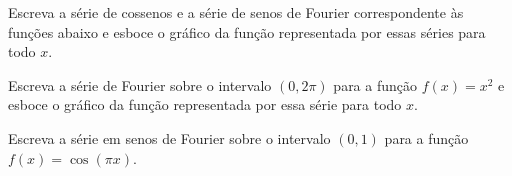 \documentclass[a4paper,12pt, leqno, answers]{exam}
\begin{document}
\begin{questions}
    \question Escreva a s\'{e}rie de cossenos e a s\'{e}rie de senos de Fourier correspondente \`{a}s fun\c{c}\~{o}es abaixo e esboce o gr\'{a}fico da fun\c{c}\~{a}o representada por essas s\'{e}ries para todo $x$.

    \question Escreva a s\'{e}rie de Fourier sobre o intervalo $(0, 2\pi)$ para a fun\c{c}\~{a}o $f(x) = x^2$ e esboce o gr\'{a}fico da fun\c{c}\~{a}o representada por essa s\'{e}rie para todo $x$.
    \begin{solution}
    \end{solution}

    \question Escreva a s\'{e}rie em senos de Fourier sobre o intervalo $(0, 1)$ para a fun\c{c}\~{a}o $f(x) = \cos(\pi x)$.
    \begin{solution}
    \end{solution}


\end{questions}
\end{document}
